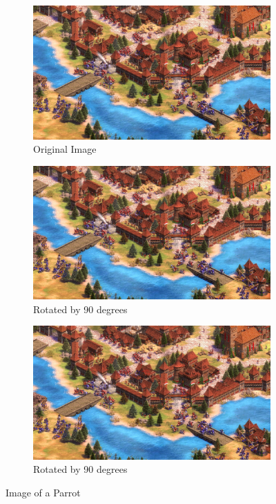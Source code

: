 \documentclass{article}
\begin{document}
	\begin{figure}
		\centering
		\begin{subfigure}{0.3\textwidth}
			\centering
			\includegraphics[width=\textwidth]{aage.jpg}
			\caption{Original Image}
		\end{subfigure}
		\hfill
		\begin{subfigure}{0.3\textwidth}
			\centering
			\includegraphics[width=\textwidth, angle=90]{aage.jpg}
			\caption{Rotated by 90 degrees}
		\end{subfigure}	
		\hfill
		\begin{subfigure}{0.3\textwidth}
			\centering
			\includegraphics[width=\textwidth, angle=90]{aage.jpg}
			\caption{Rotated by 90 degrees}
		\end{subfigure}	
		\caption{Image of a Parrot}
	\end{figure}
	
\end{document}
